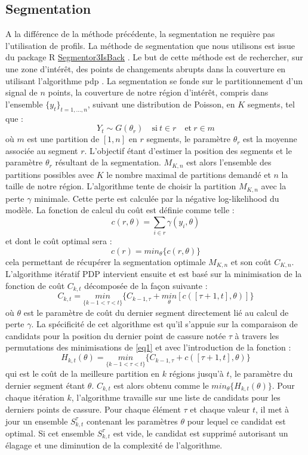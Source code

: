 \documentclass[12pt,a4paper]{report}
\begin{document}
\begin{onehalfspace}
\subsection*{Segmentation}
\label{methode_segmentation}
A la différence de la méthode précédente, la segmentation ne requière pas l'utilisation de profils. La méthode de segmentation que nous utilisons est issue du package R \href{http://cran.r-project.org/web/packages/Segmentor3IsBack/index.html}{Segmentor3IsBack} \citep{Cleynen2014}. Le but de cette méthode est de rechercher, sur une zone d'intérêt, des points de changements abrupts dans la couverture en utilisant l'algorithme \gls{pdp} \citep{Rigaill2010}. La segmentation se fonde sur le partitionnement d'un signal de $n$ points, la couverture de notre région d'intérêt, compris dans l'ensemble ${\{y_t\}_{t=1,\ldots,n}}$, suivant une distribution de Poisson, en $K$ segments, tel que :
\[ Y_t \sim G(\theta_r) \quad \text{si}\ t \in r \quad \text{et}\ r \in m \]
où $m$ est une partition de $[1,n]$ en $r$ segments, le paramètre $\theta_r$ est la moyenne associée au segment $r$. L'objectif étant d'estimer la position des segments et le paramètre $\theta_r$ résultant de la segmentation. $M_{K,n}$ est alors l'ensemble des partitions possibles avec $K$ le nombre maximal de partitions demandé et $n$ la taille de notre région. L'algorithme tente de choisir la partition $M_{K,n}$ avec la perte $\gamma$ minimale. Cette perte est calculée par la négative log-likelihood du modèle. La fonction de calcul du coût est définie comme telle :
\[ c(r,\theta) = \sum_{i \in r} \gamma(y_i,\theta) \]
et dont le coût optimal sera :
\[ c(r) = min_\theta\{c(r,\theta)\} \]
cela permettant de récupérer la segmentation optimale $M_{K,n}$ et son coût $C_{K,n}$. L'algorithme itératif PDP intervient ensuite et est basé sur la minimisation de la fonction de coût $C_{k,t}$ décomposée de la façon suivante :
\begin{equation}
\label{eq1}
C_{k,t} = \underset{\{k-1<\tau<t\}}{min} \{C_{k-1,\tau} + \underset{\theta}{min}[c([\tau + 1,t],\theta)]\}
\end{equation}
où $\theta$ est le paramètre de coût du dernier segment directement lié au calcul de perte $\gamma$. La spécificité de cet algorithme est qu'il s'appuie sur la comparaison de candidats pour la position du dernier point de cassure notée $\tau$ à travers les permutations des minimisations de \eqref{eq1} et avec l'introduction de la fonction :
\[ H_{k,t}(\theta) = \underset{\{k-1<\tau<t\}}{min} \{C_{k-1,\tau} + c([\tau + 1,t],\theta)\} \]
qui est le coût de la meilleure partition en $k$ régions jusqu'à $t$, le paramètre du dernier segment étant $\theta$. $C_{k,t}$ est alors obtenu comme le $min_\theta\{H_{k,t}(\theta)\}$.
Pour chaque itération $k$, l'algorithme travaille sur une liste de candidats pour les derniers points de cassure. Pour chaque élément $\tau$ et chaque valeur $t$, il met à jour un ensemble $S_{k,t}^\tau$ contenant les paramètres $\theta$ pour lequel ce candidat est optimal. Si cet ensemble $S_{k,t}^\tau$ est vide, le candidat est supprimé autorisant un élagage et une diminution de la complexité de l'algorithme.


\end{onehalfspace}
\end{document}
